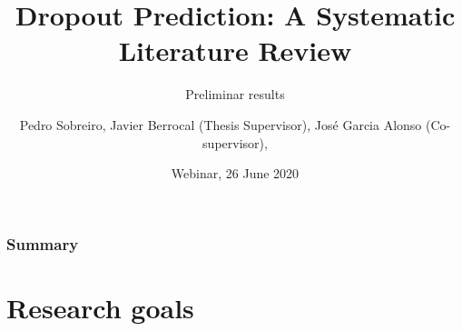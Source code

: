\documentclass[10pt]{beamer}
\title[Dropout Prediction]{Dropout Prediction: A Systematic Literature Review}
\subtitle{Preliminar results}
\author{Pedro Sobreiro, Javier Berrocal (Thesis Supervisor), José Garcia Alonso (Co-supervisor), } %
\institute[UNEX] %
{ 
University of Extremadura ~~~~~~~~~~~~~~~%
\medskip
\textit{pdealexa@alumnos.unex.es} %
}
\date{Webinar, 26 June 2020} %
\begin{document}
\begin{frame}
	\titlepage %
\end{frame}

\begin{frame}
\frametitle{Summary} %
\tableofcontents %

\end{frame}


\section{Research goals} %

\end{document}
